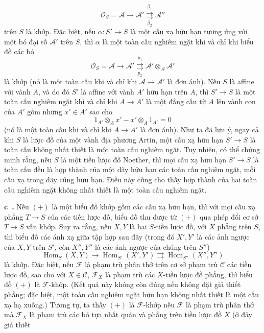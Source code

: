 \documentclass[11pt,twoside,openany]{book}
\numberwithin{equation}{section}
\newcommand{\src}[1]{%
  \phantomsection\hypertarget{src:\fgasourceid:#1}{}%
  \marginpar{\raggedleft\footnotesize\sffamily #1}%
}
\newcommand{\fgasourceid}{unset}
\newcommand{\result}[2]{\par\medskip\noindent\textbf{#1\if\relax\detokenize{#2}\relax\else\ #2\fi.}\quad}
\begin{document}
\src{306}
\[
  \mathcal O_S=\mathcal A\longrightarrow\mathcal A'
  \overset{\beta_1}{\underset{\beta_2}{\rightrightarrows}}\mathcal A''
\]
trên $S$ là khớp. Đặc biệt, nếu $\alpha:S'\longrightarrow S$ là một cấu xạ
hữu hạn tương ứng với một bó đại số $\mathcal A'$ trên $S$, thì $\alpha$ là
một toàn cấu nghiêm ngặt khi và chỉ khi biểu đồ các bó
\[
  \mathcal O_S=\mathcal A\longrightarrow\mathcal A'
  \overset{p_1}{\underset{p_2}{\rightrightarrows}}
  \mathcal A'\otimes_{\mathcal A}\mathcal A'
\]
là khớp (nó là một toàn cấu khi và chỉ khi
$\mathcal A\longrightarrow\mathcal A'$ là đơn ánh). Nếu $S$ là affine với
vành $A$, và do đó $S'$ là affine với vành $A'$ hữu hạn trên $A$, thì
$S'\longrightarrow S$ là một toàn cấu nghiêm ngặt khi và chỉ khi
$A\longrightarrow A'$ là một đẳng cấu từ $A$ lên vành con của $A'$ gồm những
$x'\in A'$ sao cho
\[
  1_{A'}\otimes_Ax'-x'\otimes_A1_{A'}=0
\]
(nó là một toàn cấu khi và chỉ khi $A\longrightarrow A'$ là đơn ánh). Như ta
đã lưu ý, ngay cả khi $S$ là lược đồ của một vành địa phương Artin, một cấu xạ
hữu hạn $S'\longrightarrow S$ là toàn cấu không nhất thiết là một toàn cấu
nghiêm ngặt. Tuy nhiên, có thể chứng minh rằng, nếu $S$ là một tiền lược đồ
Noether, thì mọi cấu xạ hữu hạn $S'\longrightarrow S$ là toàn cấu đều là hợp
thành của một dãy hữu hạn các toàn cấu nghiêm ngặt, mỗi cấu xạ trong dãy cũng
hữu hạn. Điều này cũng cho thấy hợp thành của hai toàn cấu nghiêm ngặt không
nhất thiết là một toàn cấu nghiêm ngặt.

\result{c}{} Nếu $(+)$ là một biểu đồ khớp gồm các cấu xạ hữu hạn, thì với mọi
cấu xạ phẳng $T\longrightarrow S$ của các tiền lược đồ, biểu đồ thu được từ
$(+)$ qua phép đổi cơ sở $T\longrightarrow S$ vẫn khớp. Suy ra rằng, nếu $X,Y$
là hai $S$-tiền lược đồ, với $X$ phẳng trên $S$, thì biểu đồ các ánh xạ giữa
tập hợp sau đây (trong đó $X',Y'$ là các ảnh ngược của $X,Y$ trên $S'$, còn
$X'',Y''$ là các ảnh ngược của chúng trên $S''$)
\[
  \operatorname{Hom}_S(X,Y)\longrightarrow
  \operatorname{Hom}_{S'}(X',Y')
  \rightrightarrows
  \operatorname{Hom}_{S''}(X'',Y'')
\]
là khớp. Đặc biệt, nếu $\mathcal F$ là phạm trù phân thớ trên cơ sở phạm trù
$\mathcal C$ các tiền lược đồ, sao cho với $X\in\mathcal C$, $\mathcal F_X$
là phạm trù các $X$-tiền lược đồ phẳng, thì biểu đồ $(+)$ là
$\mathcal F$-khớp. (Kết quả này không còn đúng nếu không đặt giả thiết phẳng;
đặc biệt, một toàn cấu nghiêm ngặt hữu hạn không nhất thiết là một cấu xạ hạ
xuống.) Tương tự, ta thấy $(+)$ là $\mathcal F$-khớp nếu $\mathcal F$ là phạm
trù phân thớ mà $\mathcal F_X$ là phạm trù các bó tựa nhất quán và phẳng trên
tiền lược đồ $X$ (ở đây giả thiết
\end{document}
